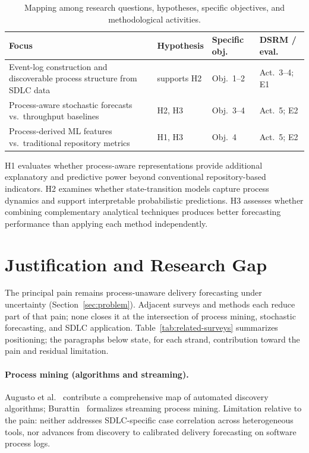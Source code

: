 \begin{table}[htbp]
\centering
\caption{Mapping among research questions, hypotheses, specific
objectives, and methodological activities.}
\label{tab:rq-obj-map}
\footnotesize
\begin{tabular}{p{3.2cm}p{2.4cm}p{3.0cm}p{3.6cm}}
\toprule
\textbf{Focus} & \textbf{Hypothesis} & \textbf{Specific obj.} & \textbf{DSRM / eval.} \\
\midrule
Event-log construction and discoverable process structure from SDLC data
  & supports H2 & Obj.~1--2 & Act.~3--4; E1 \\
Process-aware stochastic forecasts vs.\ throughput baselines
  & H2, H3 & Obj.~3--4 & Act.~5; E2 \\
Process-derived ML features vs.\ traditional repository metrics
  & H1, H3 & Obj.~4 & Act.~5; E2 \\
\bottomrule
\end{tabular}
\end{table}

H1 evaluates whether process-aware representations provide additional
explanatory and predictive power beyond conventional repository-based
indicators.
H2 examines whether state-transition models capture process dynamics and
support interpretable probabilistic predictions.
H3 assesses whether combining complementary analytical techniques
produces better forecasting performance than applying each method
independently.


\section{Justification and Research Gap}
\label{sec:justification}

The principal pain remains process-unaware delivery forecasting under
uncertainty (Section~\ref{sec:problem}).
Adjacent surveys and methods each reduce part of that pain; none closes
it at the intersection of process mining, stochastic forecasting, and
SDLC application.
Table~\ref{tab:related-surveys} summarizes positioning; the paragraphs
below state, for each strand, contribution toward the pain and residual
limitation.

\paragraph{Process mining (algorithms and streaming).}
Augusto et al.~\cite{augusto2019} contribute a comprehensive map of
automated discovery algorithms; Burattin~\cite{burattin2022} formalizes
streaming process mining.
Limitation relative to the pain: neither addresses SDLC-specific case
correlation across heterogeneous tools, nor advances from discovery to
calibrated delivery forecasting on software process logs.

